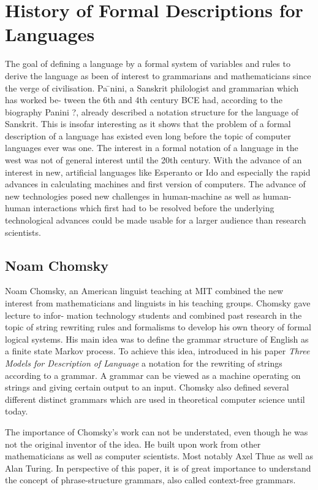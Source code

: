 \documentclass{article}
\begin{document}
\section{History of Formal Descriptions for Languages}
The goal of defining a language by a formal system of variables and rules to derive the language as been of interest to grammarians and mathematicians since the verge of civilisation. Pa ̄nini, a Sanskrit philologist and grammarian which has worked be- tween the 6th and 4th century BCE had, according to the biography Panini ?, already described a notation structure for the language of Sanskrit. This is insofar interesting as it shows that the problem of a formal description of a language has existed even long before the topic of computer languages ever was one. The interest in a formal notation of a language in the west was not of general interest until the 20th century. With the advance of an interest in new, artificial languages like Esperanto or Ido and especially the rapid advances in calculating machines and first version of computers. The advance of new technologies posed new challenges in human-machine as well as human-human interactions which first had to be resolved before the underlying technological advances could be made usable for a larger audience than research scientists.

\subsection{Noam Chomsky}
Noam Chomsky, an American linguist teaching at MIT combined the new interest from mathematicians and linguists in his teaching groups. Chomsky gave lecture to infor- mation technology students and combined past research in the topic of string rewriting rules and formalisms to develop his own theory of formal logical systems. His main idea was to define the grammar structure of English as a finite state Markov process. To achieve this idea, \cite{1056813} introduced in his paper \textit{Three Models for Description of Language} a notation for the rewriting of strings according to a grammar. A grammar can be viewed as a machine operating on strings and giving certain output to an input. Chomsky also defined several different distinct grammars which are used in theoretical computer science until today.

The importance of Chomsky’s work can not be understated, even though he was not the original inventor of the idea. He built upon work from other mathematicians as well as computer scientists. Most notably Axel Thue as well as Alan Turing. In perspective of this paper, it is of great importance to understand the concept of phrase-structure grammars, also called context-free grammars.
\end{document}
